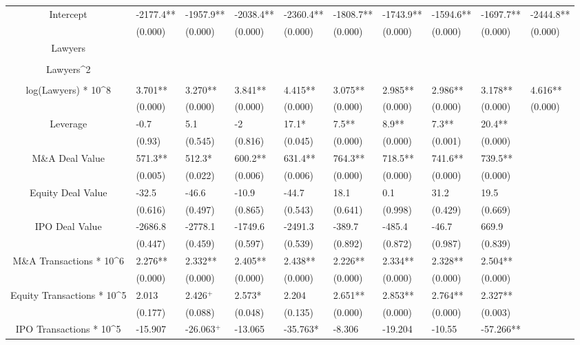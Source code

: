 \documentclass{article}
\begin{document}
\begin{table}[H]
\begin{tabular}{|clllllllll|}
Intercept & -2177.4** & -1957.9** & -2038.4** & -2360.4** & -1808.7** & -1743.9** & -1594.6** & -1697.7** & -2444.8** \\ 
   & (0.000) & (0.000) & (0.000) & (0.000) & (0.000) & (0.000) & (0.000) & (0.000) & (0.000) \\ 
  Lawyers &  &  &  &  &  &  &  &  &  \\ 
   &  &  &  &  &  &  &  &  &  \\ 
  Lawyers^2 &  &  &  &  &  &  &  &  &  \\ 
   &  &  &  &  &  &  &  &  &  \\ 
  log(Lawyers) * 10^8 & 3.701** & 3.270** & 3.841** & 4.415** & 3.075** & 2.985** & 2.986** & 3.178** & 4.616** \\ 
   & (0.000) & (0.000) & (0.000) & (0.000) & (0.000) & (0.000) & (0.000) & (0.000) & (0.000) \\ 
  Leverage & -0.7 & 5.1 & -2 & 17.1* & 7.5** & 8.9** & 7.3** & 20.4** &  \\ 
   & (0.93) & (0.545) & (0.816) & (0.045) & (0.000) & (0.000) & (0.001) & (0.000) &  \\ 
  M\&A Deal Value & 571.3** & 512.3* & 600.2** & 631.4** & 764.3** & 718.5** & 741.6** & 739.5** &  \\ 
   & (0.005) & (0.022) & (0.006) & (0.006) & (0.000) & (0.000) & (0.000) & (0.000) &  \\ 
  Equity Deal Value & -32.5 & -46.6 & -10.9 & -44.7 & 18.1 & 0.1 & 31.2 & 19.5 &  \\ 
   & (0.616) & (0.497) & (0.865) & (0.543) & (0.641) & (0.998) & (0.429) & (0.669) &  \\ 
  IPO Deal Value & -2686.8 & -2778.1 & -1749.6 & -2491.3 & -389.7 & -485.4 & -46.7 & 669.9 &  \\ 
   & (0.447) & (0.459) & (0.597) & (0.539) & (0.892) & (0.872) & (0.987) & (0.839) &  \\ 
  M\&A Transactions * 10^6 & 2.276** & 2.332** & 2.405** & 2.438** & 2.226** & 2.334** & 2.328** & 2.504** &  \\ 
   & (0.000) & (0.000) & (0.000) & (0.000) & (0.000) & (0.000) & (0.000) & (0.000) &  \\ 
  Equity Transactions * 10^5 & 2.013 & 2.426$^{+}$ & 2.573* & 2.204 & 2.651** & 2.853** & 2.764** & 2.327** &  \\ 
   & (0.177) & (0.088) & (0.048) & (0.135) & (0.000) & (0.000) & (0.000) & (0.003) &  \\ 
  IPO Transactions * 10^5 & -15.907 & -26.063$^{+}$ & -13.065 & -35.763* & -8.306 & -19.204 & -10.55 & -57.266** &  \\ 

\end{tabular}
\end{table}
\end{document}
